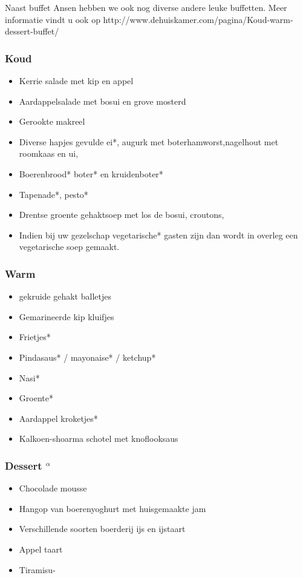 Naast buffet Ansen hebben we ook nog diverse andere leuke buffetten.
Meer informatie vindt u ook op http://www.dehuiskamer.com/pagina/Koud-warm-dessert-buffet/

\subsubsection{Koud}
\begin{itemize}
	\item	Kerrie salade met kip en appel
	\item	Aardappelsalade met bosui en grove mosterd
	\item	Gerookte makreel
	\item	Diverse hapjes gevulde ei*, augurk met boterhamworst,nagelhout met roomkaas en ui, 
	\item	Boerenbrood* boter* en kruidenboter*
	\item	Tapenade*, pesto*
	\item	Drentse groente gehaktsoep met los de bosui, croutons,
        \item	Indien bij uw gezelschap vegetarische* gasten zijn dan wordt in overleg een vegetarische soep gemaakt.
\end{itemize}

\subsubsection*{Warm}
\begin{itemize}
	\item	gekruide gehakt balletjes
	\item	Gemarineerde kip kluifjes
	\item	Frietjes*
	\item	Pindasaus* / mayonaise* / ketchup*
	\item	Nasi*
	\item	Groente*
	\item	Aardappel kroketjes*
	\item	Kalkoen-shoarma schotel met knoflooksaus
	
\end{itemize}

\subsubsection*{Dessert $^{\alpha}$}
\begin{itemize}
	\item	Chocolade mousse
	\item	Hangop van boerenyoghurt met huisgemaakte jam
	\item	Verschillende soorten boerderij ijs en ijstaart
	\item	Appel taart
	\item	Tiramisu-
\end{itemize}
